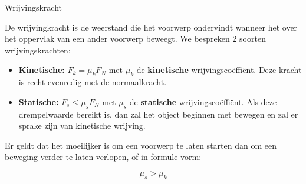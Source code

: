 \begin{theo}[Wrijvingskracht]{Wrijvingskracht}

    De wrijvingkracht is de weerstand die het voorwerp ondervindt wanneer het over het oppervlak van een ander voorwerp beweegt. We bespreken 2 soorten wrijvingskrachten:
    
    \begin{itemize}
        \item \textbf{Kinetische:} $ F_k = \mu_kF_N$ met $ \mu_k $ de \textbf{kinetische} wrijvingscoëffiënt. Deze kracht is recht evenredig met de normaalkracht.
        \item \textbf{Statische:} $ F_s \leq \mu_sF_N$ met $ \mu_s $ de \textbf{statische} wrijvingscoëffiënt. Als deze drempelwaarde bereikt is, dan zal het object beginnen met bewegen en zal er sprake zijn van kinetische wrijving.
    \end{itemize}
    
    \noindent Er geldt dat het moeilijker is om een voorwerp te laten starten dan om een beweging verder te laten verlopen, of in formule vorm: 
    
    \vspace{-0.2cm}
    \begin{equation*}
        \mu_s > \mu_k
    \end{equation*} 
    \vspace{-0.4cm}
\end{theo}


